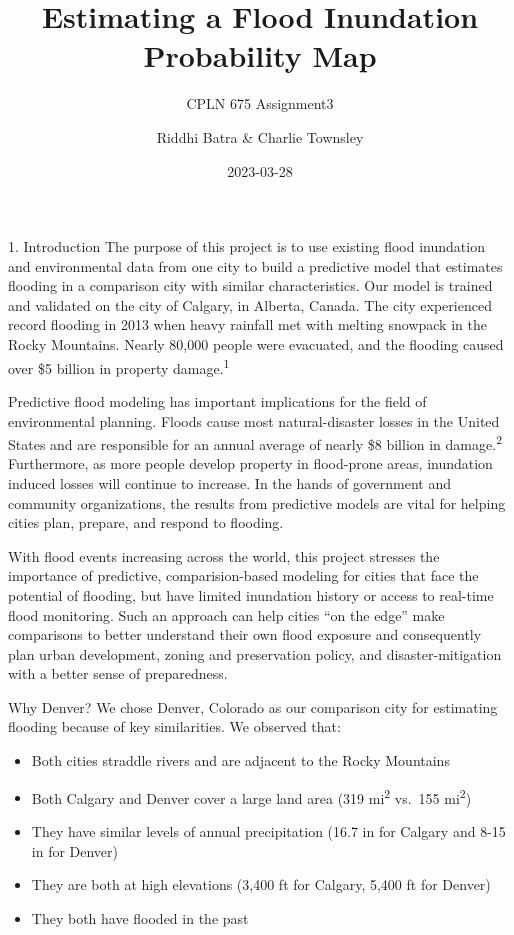 \documentclass[
  ignorenonframetext,
]{beamer}
\title{Estimating a Flood Inundation Probability Map}
\subtitle{CPLN 675 Assignment3}
\author{Riddhi Batra \& Charlie Townsley}
\date{2023-03-28}
\begin{document}
\frame{\titlepage}

\begin{frame}[fragile]{1. Introduction}
\protect\hypertarget{introduction}{}
The purpose of this project is to use existing flood inundation and
environmental data from one city to build a predictive model that
estimates flooding in a comparison city with similar characteristics.
Our model is trained and validated on the city of Calgary, in Alberta,
Canada. The city experienced record flooding in 2013 when heavy rainfall
met with melting snowpack in the Rocky Mountains. Nearly 80,000 people
were evacuated, and the flooding caused over \$5 billion in property
damage.\textsuperscript{1}

Predictive flood modeling has important implications for the field of
environmental planning. Floods cause most natural-disaster losses in the
United States and are responsible for an annual average of nearly \$8
billion in damage.\textsuperscript{2} Furthermore, as more people
develop property in flood-prone areas, inundation induced losses will
continue to increase. In the hands of government and community
organizations, the results from predictive models are vital for helping
cities plan, prepare, and respond to flooding.

With flood events increasing across the world, this project stresses the
importance of predictive, comparision-based modeling for cities that
face the potential of flooding, but have limited inundation history or
access to real-time flood monitoring. Such an approach can help cities
``on the edge'' make comparisons to better understand their own flood
exposure and consequently plan urban development, zoning and
preservation policy, and disaster-mitigation with a better sense of
preparedness.

\begin{block}{Why Denver?}
\protect\hypertarget{why-denver}{}
We chose Denver, Colorado as our comparison city for estimating flooding
because of key similarities. We observed that:

\begin{itemize}
\item
  Both cities straddle rivers and are adjacent to the Rocky Mountains
\item
  Both Calgary and Denver cover a large land area (319
  mi\textsuperscript{2} vs.~155 mi\textsuperscript{2})
\item
  They have similar levels of annual precipitation (16.7 in for Calgary
  and 8-15 in for Denver)
\item
  They are both at high elevations (3,400 ft for Calgary, 5,400 ft for
  Denver)
\item
  They both have flooded in the past
\end{itemize}
\end{block}


\end{frame}
\end{document}
